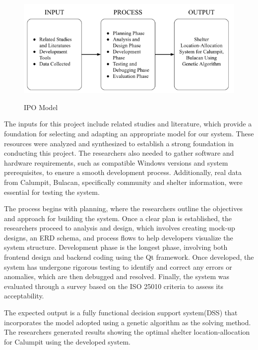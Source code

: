 	 \begin{figure}[h!]
		\centering
		\caption{IPO Model} \label{fig:ipo}
		\includegraphics[width=\linewidth]{IPO}
		\label{IPOModel}
	\end{figure}
	
	The inputs for this project include related studies and literature, which provide a foundation for selecting and adapting an appropriate model for our system. These resources were analyzed and synthesized to establish a strong foundation in conducting this project. The researchers also needed to gather software and hardware requirements, such as compatible Windows versions and system prerequisites, to ensure a smooth development process. Additionally, real data from Calumpit, Bulacan, specifically community and shelter information, were essential for testing the system.
	
	The process begins with planning, where the researchers outline the objectives and approach for building the system. Once a clear plan is established, the researchers proceed to analysis and design, which involves creating mock-up designs, an ERD schema, and process flows to help developers visualize the system structure. Development phase is the longest phase, involving both frontend design and backend coding using the Qt framework. Once developed, the system has undergone rigorous testing to identify and correct any errors or anomalies, which are then debugged and resolved. Finally, the system was evaluated through a survey based on the ISO 25010 criteria to assess its acceptability.
	
	The expected output is a fully functional decision support system(DSS) that incorporates the  model adopted using a genetic algorithm as the solving method. The researchers generated results showing the optimal shelter location-allocation for Calumpit using the developed system.
	



